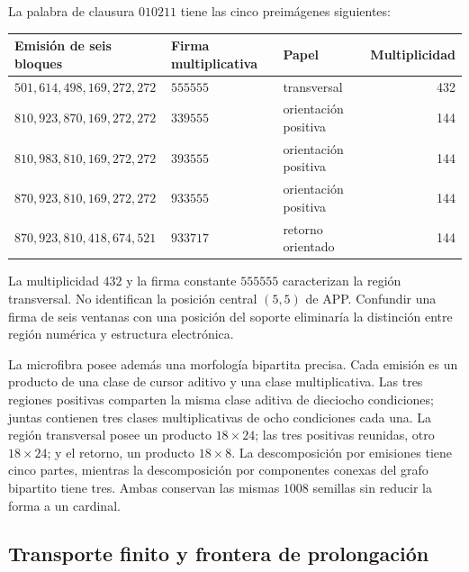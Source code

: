 La palabra de clausura \(010211\) tiene las cinco preimágenes siguientes:
\begin{center}\small
\begin{tabular}{@{}lll r@{}}\toprule
Emisión de seis bloques&Firma multiplicativa&Papel&Multiplicidad\\\midrule
\(501,614,498,169,272,272\)&\(555555\)&transversal&432\\
\(810,923,870,169,272,272\)&\(339555\)&orientación positiva&144\\
\(810,983,810,169,272,272\)&\(393555\)&orientación positiva&144\\
\(870,923,810,169,272,272\)&\(933555\)&orientación positiva&144\\
\(870,923,810,418,674,521\)&\(933717\)&retorno orientado&144\\\bottomrule
\end{tabular}
\end{center}
La multiplicidad \(432\) y la firma constante \(555555\) caracterizan la región transversal. No identifican la posición central \((5,5)\) de APP. Confundir una firma de seis ventanas con una posición del soporte eliminaría la distinción entre región numérica y estructura electrónica.

La microfibra posee además una morfología bipartita precisa. Cada emisión es un producto de una clase de cursor aditivo y una clase multiplicativa. Las tres regiones positivas comparten la misma clase aditiva de dieciocho condiciones; juntas contienen tres clases multiplicativas de ocho condiciones cada una. La región transversal posee un producto \(18\times24\); las tres positivas reunidas, otro \(18\times24\); y el retorno, un producto \(18\times8\). La descomposición por emisiones tiene cinco partes, mientras la descomposición por componentes conexas del grafo bipartito tiene tres. Ambas conservan las mismas \(1008\) semillas sin reducir la forma a un cardinal.

\subsection{Transporte finito y frontera de prolongación}

